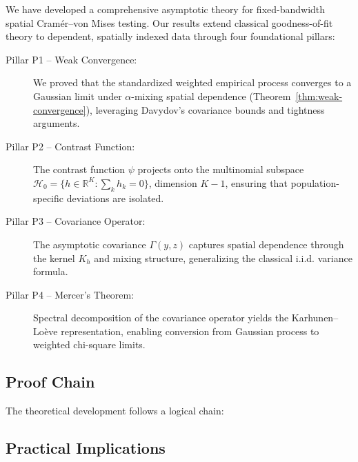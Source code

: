 We have developed a comprehensive asymptotic theory for fixed-bandwidth spatial Cram\'{e}r--von Mises testing. Our results extend classical goodness-of-fit theory to dependent, spatially indexed data through four foundational pillars:

\begin{description}
\item[Pillar P1 -- Weak Convergence:] We proved that the standardized weighted empirical process converges to a Gaussian limit under $\alpha$-mixing spatial dependence (Theorem~\ref{thm:weak-convergence}), leveraging Davydov's covariance bounds and tightness arguments.

\item[Pillar P2 -- Contrast Function:] The contrast function $\psi$ projects onto the multinomial subspace $\mathcal{H}_0 = \{h \in \mathbb{R}^K : \sum_k h_k = 0\}$, dimension $K-1$, ensuring that population-specific deviations are isolated.

\item[Pillar P3 -- Covariance Operator:] The asymptotic covariance $\Gamma(y,z)$ captures spatial dependence through the kernel $K_h$ and mixing structure, generalizing the classical i.i.d. variance formula.

\item[Pillar P4 -- Mercer's Theorem:] Spectral decomposition of the covariance operator yields the Karhunen--Lo\`{e}ve representation, enabling conversion from Gaussian process to weighted chi-square limits.
\end{description}

\subsection{Proof Chain}

The theoretical development follows a logical chain:
\begin{center}
\end{center}

\subsection{Practical Implications}

